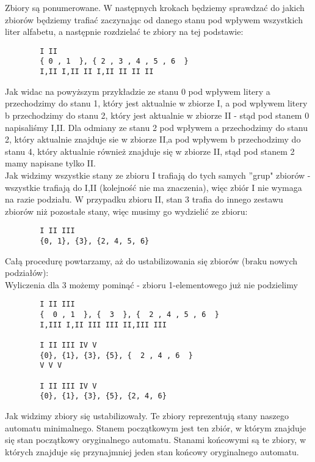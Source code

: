 \documentclass[main.tex]{subfiles}
\begin{document}
    \noindent Zbiory są ponumerowane. W następnych krokach będziemy sprawdzać do jakich zbiorów będziemy trafiać zaczynając od danego stanu pod wpływem wszystkich liter alfabetu,
    a następnie rozdzielać te zbiory na tej podstawie:
    \begin{verbatim}
        I II
        { 0 , 1  }, { 2 , 3 , 4 , 5 , 6  }
        I,II I,II II I,II II II II
    \end{verbatim}

    \noindent Jak widac na powyższym przykładzie ze stanu 0 pod wpływem litery a przechodzimy do stanu 1, który jest aktualnie w zbiorze I,
    a pod wpływem litery b przechodzimy do stanu 2, który jest aktualnie w zbiorze II - stąd pod stanem 0 napisaliśmy I,II.
    Dla odmiany ze stanu 2 pod wpływem a przechodzimy do stanu 2, który aktualnie znajduje sie w zbiorze II,a pod wpływem b przechodzimy do stanu 4,
    który aktualnie również znajduje się w zbiorze II, stąd pod stanem 2 mamy napisane tylko II. \\

    \noindent Jak widzimy wszystkie stany ze zbioru I trafiają do tych samych ''grup" zbiorów - wszystkie trafiają do I,II (kolejność nie ma znaczenia),
    więc zbiór I nie wymaga na razie podziału. W przypadku zbioru II, stan 3 trafia do innego zestawu zbiorów niż pozostałe stany, więc musimy go wydzielić ze zbioru:
    \begin{verbatim}
        I II III
        {0, 1}, {3}, {2, 4, 5, 6}
    \end{verbatim}

    \noindent Całą procedurę powtarzamy, aż do ustabilizowania się zbiorów (braku nowych podziałów): \\
    \noindent Wyliczenia dla 3 możemy pominąć - zbioru 1-elementowego już nie podzielimy
    \begin{verbatim}
        I II III
        {  0 , 1  }, {  3  }, {  2 , 4 , 5 , 6  }
        I,III I,II III III II,III III

        I II III IV V
        {0}, {1}, {3}, {5}, {  2 , 4 , 6  }
        V V V

        I II III IV V
        {0}, {1}, {3}, {5}, {2, 4, 6}
    \end{verbatim}

    \noindent Jak widzimy zbiory się ustabilizowały. Te zbiory reprezentują stany naszego automatu minimalnego.
    Stanem początkowym jest ten zbiór, w którym znajduje się stan początkowy oryginalnego automatu.
    Stanami końcowymi są te zbiory, w których znajduje się przynajmniej jeden stan końcowy oryginalnego automatu. \\
\end{document}

